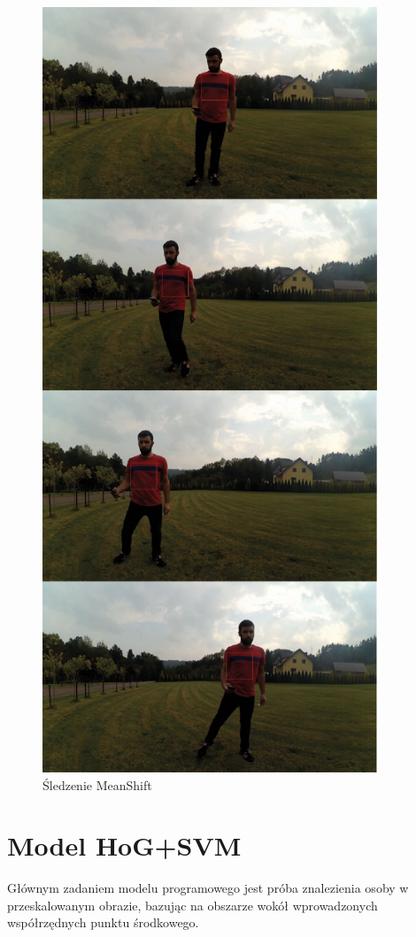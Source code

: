 \begin{figure}[]
	\centering
	\includegraphics[width=10cm]{3_meanshift.jpg}
	\caption{Śledzenie MeanShift}
	\label{fig:meanshift_prog}
\end{figure}

\section{Model HoG+SVM}

Głównym zadaniem modelu programowego jest próba znalezienia osoby w przeskalowanym obrazie, bazując na obszarze wokół wprowadzonych współrzędnych punktu środkowego.

